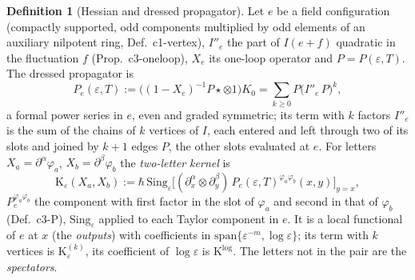 \documentclass[11pt]{article}
\numberwithin{equation}{section}
\theoremstyle{plain}
\theoremstyle{definition}
\newtheorem{definition}[theorem]{Definition}
\begin{document}
\begin{definition}[Hessian and dressed propagator]
\label{def:tl-dressed}
Let $e$ be a field configuration (compactly supported, odd components multiplied by odd elements of an auxiliary nilpotent ring, Def.~c1-vertex), $I''_e$ the part of $I(e+f)$ quadratic in the fluctuation $f$ (Prop.~c3-oneloop), $X_e$ its one-loop operator and $P=P(\varepsilon,T)$. The dressed propagator is
\[
P_e(\varepsilon,T):=\big((1-X_e)^{-1}P\star\otimes1\big)K_0=\sum_{k\ge0}P\big(I''_e\,P\big)^k ,
\]
a formal power series in $e$, even and graded symmetric; its term with $k$ factors $I''_e$ is the sum of the chains of $k$ vertices of $I$, each entered and left through two of its slots and joined by $k+1$ edges $P$, the other slots evaluated at $e$. For letters $X_a=\partial^\alpha\varphi_a$, $X_b=\partial^\beta\varphi_b$ the \emph{two-letter kernel} is
\begin{equation}
\mathrm K_\varepsilon(X_a,X_b):=\hbar\,\mathrm{Sing}_\varepsilon\Big[(\partial^\alpha_x\otimes\partial^\beta_y)\,P_e(\varepsilon,T)^{\varphi_a\varphi_b}(x,y)\Big]_{y=x},
\label{eq:tl-kernel}
\end{equation}
$P_e^{\varphi_a\varphi_b}$ the component with first factor in the slot of $\varphi_a$ and second in that of $\varphi_b$ (Def.~c3-P), $\mathrm{Sing}_\varepsilon$ applied to each Taylor component in $e$. It is a local functional of $e$ at $x$ (the \emph{outputs}) with coefficients in $\mathrm{span}\{\varepsilon^{-m},\log\varepsilon\}$; its term with $k$ vertices is $\mathrm K^{(k)}_\varepsilon$, its coefficient of $\log\varepsilon$ is $\mathrm K^{\log}$. The letters not in the pair are the \emph{spectators}.
\end{definition}
\end{document}
